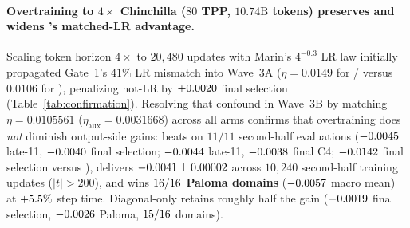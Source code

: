 \paragraph{Overtraining to $4\times$ Chinchilla ($80$ TPP, $10.74\text{B}$ tokens) preserves and widens 's matched-LR advantage.}
Scaling token horizon $4\times$ to $20{,}480$ updates with Marin's $4^{-0.3}$ LR
law initially propagated Gate~1's $41\%$ LR mismatch into Wave~3A
($\eta = 0.0149$ for / versus $0.0106$ for
), penalizing hot-LR  by
$+0.0020{}$ final selection (Table~\ref{tab:confirmation}).
Resolving that confound in Wave~3B by matching $\eta = 0.0105561$
($\eta_{\text{aux}} = 0.0031668$) across all arms confirms that overtraining
does \emph{not} diminish output-side gains:  beats
 on $11/11$ second-half evaluations ($-0.0045{}$
late-11, $-0.0040{}$ final selection; $-0.0044{}$
late-11, $-0.0038{}$ final C4; $-0.0142{}$
final selection versus ), delivers
$-0.0041{} \pm 0.00002{}$ across $10{,}240$
second-half training updates ($|t| > 200$), and wins
\textbf{$16{}/16$ Paloma domains}
($-0.0057{}$ macro mean) at $+5.5\%$ step
time. Diagonal-only  retains roughly half the gain
($-0.0019{}$ final selection, $-0.0026{}$ Paloma,
$15{}/16$ domains).

